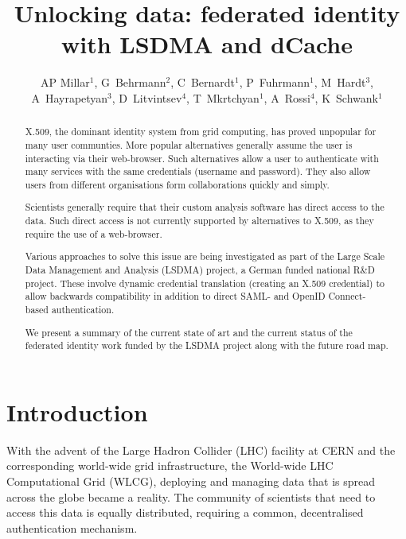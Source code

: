 \documentclass[a4paper]{jpconf}
\begin{document}
\title{Unlocking data: federated identity with LSDMA and dCache}

\author{AP Millar$^1$, G~Behrmann$^2$, C~Bernardt$^1$, P~Fuhrmann$^1$,
  M~Hardt$^3$, A~Hayrapetyan$^3$, D~Litvintsev$^4$, T~Mkrtchyan$^1$,
  A~Rossi$^4$, K~Schwank$^1$}

\address{$^1$ IT Dept., DESY, Notkestrasse 85, Hamburg, Germany}
\address{$^2$ Gerd Behrmann, Copenhagen, Denmark}
\address{$^3$ Steinbuch Centre for Computing, Hermann-von-Helmholtz-Platz 1, Karlsruhe, Germany}
\address{$^4$ Fermilab, Batavia, IL, USA}


\begin{abstract}
X.509, the dominant identity system from grid computing, has proved
unpopular for many user communties. More popular alternatives
generally assume the user is interacting via their web-browser. Such
alternatives allow a user to authenticate with many services with the
same credentials (username and password). They also allow users from
different organisations form collaborations quickly and simply.

Scientists generally require that their custom analysis software has
direct access to the data. Such direct access is not currently
supported by alternatives to X.509, as they require the use of a
web-browser.

Various approaches to solve this issue are being investigated as part
of the Large Scale Data Management and Analysis (LSDMA) project, a
German funded national R\&D project. These involve dynamic credential
translation (creating an X.509 credential) to allow backwards
compatibility in addition to direct SAML- and OpenID Connect-based
authentication.

We present a summary of the current state of art and the current
status of the federated identity work funded by the LSDMA project
along with the future road map.
\end{abstract}

\section{Introduction}
With the advent of the Large Hadron Collider (LHC) facility at CERN
and the corresponding world-wide grid infrastructure, the World-wide
LHC Computational Grid (WLCG), deploying and managing data that is
spread across the globe became a reality.  The community of scientists
that need to access this data is equally distributed, requiring a
common, decentralised authentication mechanism.
\end{document}
